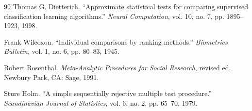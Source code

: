 \documentclass[10pt,a4paper,parskip=half-]{scrartcl}
\begin{document}
\begin{thebibliography}{99}
Thomas G. Dietterich. ``Approximate statistical tests for comparing supervised classification learning algorithms.'' \textit{Neural Computation}, vol. 10, no. 7, pp. 1895--1923, 1998.

Frank Wilcoxon. ``Individual comparisons by ranking methods.'' \textit{Biometrics Bulletin}, vol. 1, no. 6, pp. 80--83, 1945.

Robert Rosenthal. \textit{Meta-Analytic Procedures for Social Research}, revised ed. Newbury Park, CA: Sage, 1991.


Sture Holm. ``A simple sequentially rejective multiple test procedure.'' \textit{Scandinavian Journal of Statistics}, vol. 6, no. 2, pp. 65--70, 1979.
\end{thebibliography}
\end{document}
